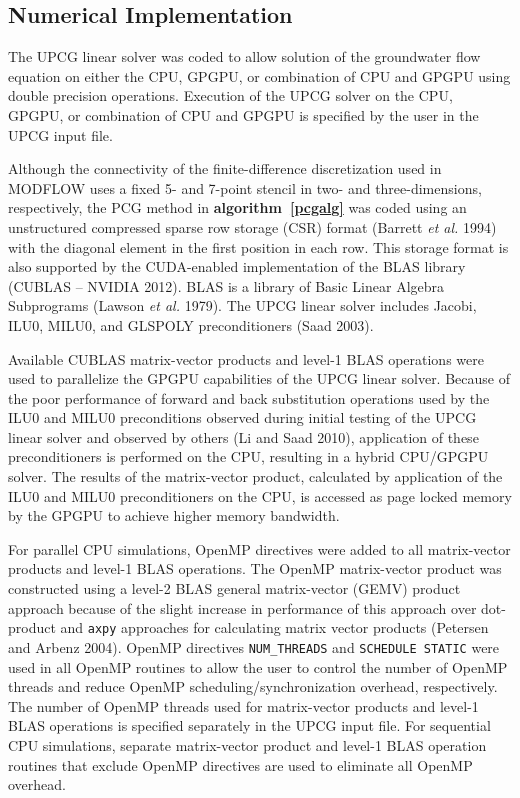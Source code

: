 \documentclass[12pt]{article}
\begin{document}
\subsection*{Numerical Implementation}
The UPCG linear solver was coded to allow solution of the groundwater flow equation on either the CPU, GPGPU, or combination of CPU and GPGPU using double precision operations. Execution of the UPCG solver on the CPU, GPGPU, or combination of CPU and GPGPU is specified by the user in the UPCG input file.

Although the connectivity of the finite-difference discretization used in MODFLOW uses a fixed 5- and 7-point stencil in two- and three-dimensions, respectively, the PCG method in \textbf{algorithm~\ref{pcgalg}} was coded using an unstructured compressed sparse row storage (CSR) format  (Barrett \textit{et al.} 1994) with the diagonal element in the first position in each row. This storage format is also supported by the \color{blue}CUDA-enabled implementation of the BLAS library (CUBLAS -- NVIDIA 2012). BLAS is a library of Basic Linear Algebra Subprograms (Lawson \textit{et al.} 1979)\color{black}. The UPCG linear solver includes Jacobi, ILU0, MILU0, and GLSPOLY preconditioners (\color{cyan}Saad \color{black}2003).

Available CUBLAS matrix-vector products and level-1 BLAS operations were used to parallelize the GPGPU capabilities of the UPCG linear solver. Because of the poor performance of forward and back substitution operations used by the ILU0 and MILU0 preconditions observed during initial testing of the UPCG linear solver and observed by others (Li and Saad 2010), application of these preconditioners is performed on the CPU, resulting in a hybrid CPU/GPGPU solver. The results of the matrix-vector product, calculated by application of the ILU0 and MILU0 preconditioners on the CPU, is accessed as page locked memory by the GPGPU to achieve higher memory bandwidth.

For parallel CPU simulations, OpenMP directives were added to all matrix-vector products and level-1 BLAS operations. The OpenMP matrix-vector product was constructed using a level-2 BLAS \color{cyan}general matrix-vector (GEMV) product \color{black}approach because of the slight increase in performance of this approach over dot-product and \texttt{axpy} approaches for calculating matrix vector products (Petersen and Arbenz 2004). OpenMP directives \texttt{NUM\_THREADS} and \texttt{SCHEDULE STATIC} were used in all OpenMP routines to allow the user to control the number of OpenMP threads and reduce OpenMP scheduling/synchronization overhead, respectively. The number of OpenMP threads used for matrix-vector products and level-1 BLAS operations is specified separately in the UPCG input file. For sequential CPU simulations,  separate matrix-vector product and level-1 BLAS operation routines that exclude OpenMP directives are used to eliminate all OpenMP overhead.
\end{document}
